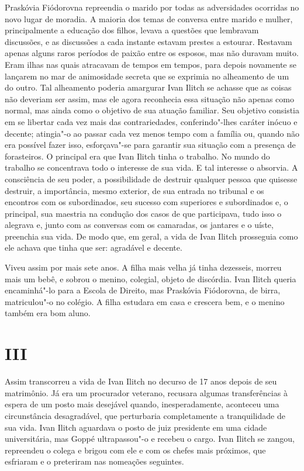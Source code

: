 Praskóvia Fiódorovna repreendia o marido por todas as adversidades
ocorridas no novo lugar de moradia. A maioria dos temas de conversa
entre marido e mulher, principalmente a educação dos filhos, levava a
questões que lembravam discussões, e as discussões a cada instante
estavam prestes a estourar. Restavam apenas alguns raros períodos de
paixão entre os esposos, mas não duravam muito. Eram ilhas nas quais
atracavam de tempos em tempos, para depois novamente se lançarem no mar
de animosidade secreta que se exprimia no alheamento de um do outro. Tal
alheamento poderia amargurar Ivan Ilitch se achasse que as coisas não
deveriam ser assim, mas ele agora reconhecia essa situação não apenas
como normal, mas ainda como o objetivo de sua atuação familiar. Seu
objetivo consistia em se libertar cada vez mais das contrariedades,
conferindo"-lhes caráter inócuo e decente; atingia"-o ao passar cada vez
menos tempo com a família ou, quando não era possível fazer isso,
esforçava"-se para garantir sua situação com a presença de forasteiros. O
principal era que Ivan Ilitch tinha o trabalho. No mundo do trabalho se
concentrava todo o interesse de sua vida. E tal interesse o absorvia. A
consciência de seu poder, a possibilidade de destruir qualquer pessoa
que quisesse destruir, a importância, mesmo exterior, de sua entrada no
tribunal e os encontros com os subordinados, seu sucesso com superiores
e subordinados e, o principal, sua maestria na condução dos casos de que
participava, tudo isso o alegrava e, junto com as conversas com os
camaradas, os jantares e o uíste, preenchia sua vida. De modo que, em
geral, a vida de Ivan Ilitch prosseguia como ele achava que tinha que
ser: agradável e decente.

Viveu assim por mais sete anos. A filha mais velha já tinha dezesseis,
morreu mais um bebê, e sobrou o menino, colegial, objeto de discórdia.
Ivan Ilitch queria encaminhá"-lo para a Escola de Direito, mas Praskóvia
Fiódorovna, de birra, matriculou"-o no colégio. A filha estudara em casa
e crescera bem, e o menino também era bom aluno.

\section{III}

Assim transcorreu a vida de Ivan Ilitch no decurso de 17 anos depois de
seu matrimônio. Já era um procurador veterano, recusara algumas
transferências à espera de um posto mais desejável quando,
inesperadamente, aconteceu uma circunstância desagradável, que
perturbaria completamente a tranquilidade de sua vida. Ivan Ilitch
aguardava o posto de juiz presidente em uma cidade universitária, mas
Goppé ultrapassou"-o e recebeu o cargo. Ivan Ilitch se zangou, repreendeu
o colega e brigou com ele e com os chefes mais próximos, que esfriaram e
o preteriram nas nomeações seguintes.


